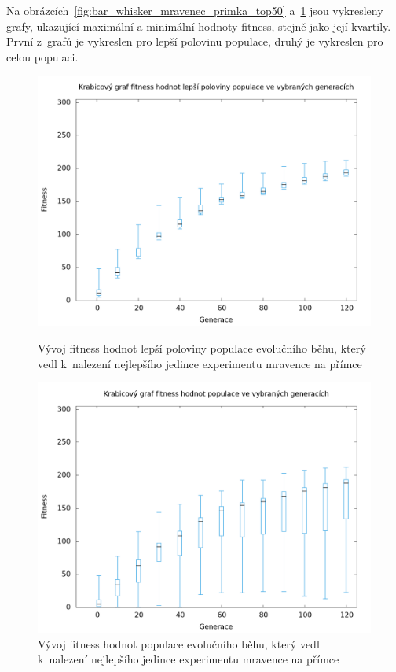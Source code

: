 Na obrázcích~\ref{fig:bar_whisker_mravenec_primka_top50} a~\ref{fig:bar_whisker_mravenec_primka} jsou vykresleny grafy, ukazující maximální a minimální hodnoty fitness, stejně jako její kvartily.
První z~grafů je vykreslen pro lepší polovinu populace, druhý je vykreslen pro celou populaci.

\begin{figure}[h]
    \begin{minipage}[c]{0.48\linewidth}
        \includegraphics[width=\linewidth]{obrazky/bar_whisker_mravenec_primka_top50.png}
        \caption{Vývoj fitness hodnot lepší poloviny populace evolučního běhu, který vedl k~nalezení nejlepšího jedince experimentu mravence na přímce}
        \label{fig:bar_whisker_mravenec_primka_top50}
    \end{minipage}
    \hfill
    \begin{minipage}[c]{0.48\linewidth}
        \includegraphics[width=\linewidth]{obrazky/bar_whisker_mravenec_primka.png}
        \caption{Vývoj fitness hodnot populace evolučního běhu, který vedl k~nalezení nejlepšího jedince experimentu mravence na přímce}
        \label{fig:bar_whisker_mravenec_primka}
    \end{minipage}
\end{figure}

